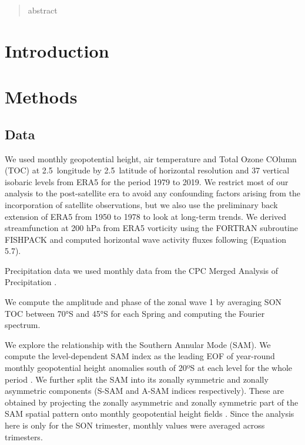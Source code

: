 \documentclass[smallextended]{svjour3}       %
\begin{document}
\begin{abstract}
abstract
\\
\keywords{
         \and
    }


\end{abstract}


\def\spacingset#1{\renewcommand{\baselinestretch}%
{#1}\small\normalsize} \spacingset{1}


\hypertarget{introduction}{%
\section{Introduction}\label{introduction}}

\hypertarget{methods}{%
\section{Methods}\label{methods}}

\hypertarget{data}{%
\subsection{Data}\label{data}}

We used monthly geopotential height, air temperature and Total Ozone COlumn (TOC) at 2.5\degree~longitude by 2.5\degree~latitude of horizontal resolution and 37 vertical isobaric levels from ERA5 \citep{era5} for the period 1979 to 2019. We restrict most of our analysis to the post-satellite era to avoid any confounding factors arising from the incorporation of satellite observations, but we also use the preliminary back extension of ERA5 from 1950 to 1978 \citep{era5be} to look at long-term trends. We derived streamfunction at 200 hPa from ERA5 vorticity using the FORTRAN subroutine FISHPACK \citep{fishpack} and computed horizontal wave activity fluxes following \citet{plumb1985} (Equation 5.7).

Precipitation data we used monthly data from the CPC Merged Analysis of Precipitation \citep{cmap}.

We compute the amplitude and phase of the zonal wave 1 by averaging SON TOC between 70°S and 45°S for each Spring and computing the Fourier spectrum.

We explore the relationship with the Southern Annular Mode (SAM). We compute the level-dependent SAM index as the leading EOF of year-round monthly geopotential height anomalies south of 20ºS at each level for the whole period \citep{baldwin2009}. We further split the SAM into its zonally symmetric and zonally asymmetric components (S-SAM and A-SAM indices respectively). These are obtained by projecting the zonally asymmetric and zonally symmetric part of the SAM spatial pattern onto monthly geopotential height fields \citep{campitelli2021}. Since the analysis here is only for the SON trimester, monthly values were averaged across trimesters.
\end{document}
